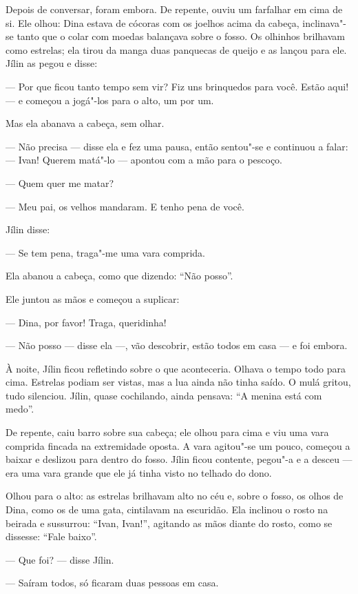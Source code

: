 Depois de conversar, foram embora. De repente, ouviu um farfalhar em
cima de si. Ele olhou: Dina estava de cócoras com os joelhos acima da
cabeça, inclinava"-se tanto que o colar com moedas balançava sobre o
fosso. Os olhinhos brilhavam como estrelas; ela tirou da manga duas
panquecas de queijo e as lançou para ele. Jílin as pegou e disse:

--- Por que ficou tanto tempo sem vir? Fiz uns brinquedos para você.
Estão aqui! --- e começou a jogá"-los para o alto, um por um.

Mas ela abanava a cabeça, sem olhar.

--- Não precisa --- disse ela e fez uma pausa, então sentou"-se e
continuou a falar: --- Ivan! Querem matá"-lo --- apontou com a mão para o
pescoço.

--- Quem quer me matar?

--- Meu pai, os velhos mandaram. E tenho pena de você.

Jílin disse:

--- Se tem pena, traga"-me uma vara comprida.

Ela abanou a cabeça, como que dizendo: ``Não posso''.

Ele juntou as mãos e começou a suplicar:

--- Dina, por favor! Traga, queridinha!

--- Não posso --- disse ela ---, vão descobrir, estão todos em casa ---
e foi embora.

À noite, Jílin ficou refletindo sobre o que aconteceria. Olhava o tempo
todo para cima. Estrelas podiam ser vistas, mas a lua ainda não tinha
saído. O mulá gritou, tudo silenciou. Jílin, quase cochilando, ainda
pensava: ``A menina está com medo''.

De repente, caiu barro sobre sua cabeça; ele olhou para cima e viu uma
vara comprida fincada na extremidade oposta. A vara agitou"-se um pouco,
começou a baixar e deslizou para dentro do fosso. Jílin ficou contente,
pegou"-a e a desceu --- era uma vara grande que ele já tinha visto no
telhado do dono.

Olhou para o alto: as estrelas brilhavam alto no céu e, sobre o fosso,
os olhos de Dina, como os de uma gata, cintilavam na escuridão. Ela
inclinou o rosto na beirada e sussurrou: ``Ivan, Ivan!'', agitando as
mãos diante do rosto, como se dissesse: ``Fale baixo''.

--- Que foi? --- disse Jílin.

--- Saíram todos, só ficaram duas pessoas em casa.

